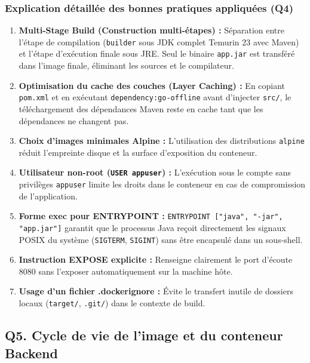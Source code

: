 \documentclass[11pt,a4paper]{article}
\begin{document}
\subsubsection{Explication détaillée des bonnes pratiques appliquées (Q4)}
\begin{enumerate}
  \item \textbf{Multi-Stage Build (Construction multi-étapes) :} Séparation entre l'étape de compilation (\texttt{builder} sous JDK complet Temurin 23 avec Maven) et l'étape d'exécution finale sous JRE. Seul le binaire \texttt{app.jar} est transféré dans l'image finale, éliminant les sources et le compilateur.
  \item \textbf{Optimisation du cache des couches (Layer Caching) :} En copiant \texttt{pom.xml} et en exécutant \texttt{dependency:go-offline} avant d'injecter \texttt{src/}, le téléchargement des dépendances Maven reste en cache tant que les dépendances ne changent pas.
  \item \textbf{Choix d'images minimales Alpine :} L'utilisation des distributions \texttt{alpine} réduit l'empreinte disque et la surface d'exposition du conteneur.
  \item \textbf{Utilisateur non-root (\texttt{USER appuser}) :} L'exécution sous le compte sans privilèges \texttt{appuser} limite les droits dans le conteneur en cas de compromission de l'application.
  \item \textbf{Forme exec pour ENTRYPOINT :} \texttt{ENTRYPOINT ["java", "-jar", "app.jar"]} garantit que le processus Java reçoit directement les signaux POSIX du système (\texttt{SIGTERM}, \texttt{SIGINT}) sans être encapsulé dans un sous-shell.
  \item \textbf{Instruction EXPOSE explicite :} Renseigne clairement le port d'écoute 8080 sans l'exposer automatiquement sur la machine hôte.
  \item \textbf{Usage d'un fichier .dockerignore :} Évite le transfert inutile de dossiers locaux (\texttt{target/}, \texttt{.git/}) dans le contexte de build.
\end{enumerate}

\subsection{Q5. Cycle de vie de l'image et du conteneur Backend}
\end{document}
